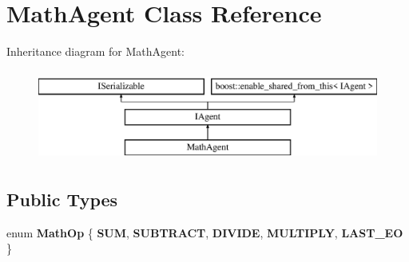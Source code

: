 \hypertarget{class_math_agent}{}\section{Math\+Agent Class Reference}
\label{class_math_agent}
Inheritance diagram for Math\+Agent\+:\begin{figure}[H]
\begin{center}
\leavevmode
\includegraphics[height=3.000000cm]{class_math_agent}
\end{center}
\end{figure}
\subsection*{Public Types}
\begin{DoxyCompactItemize}
\item 
\mbox{\label{class_math_agent_a9860d1a8c881e57b8df7fb1c0d8821b9}} 
enum {\bfseries Math\+Op} \{ \newline
{\bfseries S\+UM}, 
{\bfseries S\+U\+B\+T\+R\+A\+CT}, 
{\bfseries D\+I\+V\+I\+DE}, 
{\bfseries M\+U\+L\+T\+I\+P\+LY}, 
\newline
{\bfseries L\+A\+S\+T\+\_\+\+EO}
 \}
\end{DoxyCompactItemize}
